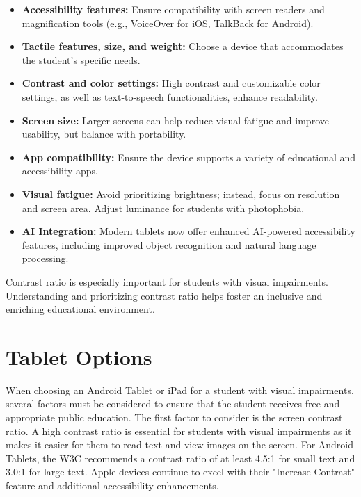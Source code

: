 \begin{itemize}

    \item \textbf{Accessibility features:} Ensure compatibility with screen readers and magnification tools (e.g., VoiceOver for iOS, TalkBack for Android).
     \cite{AndroidAccessibility}

    \item \textbf{Tactile features, size, and weight:} Choose a device that accommodates the student's specific needs.

    \item \textbf{Contrast and color settings:} High contrast and customizable color settings, as well as text-to-speech functionalities, enhance readability.

    \item \textbf{Screen size:} Larger screens can help reduce visual fatigue and improve usability, but balance with portability.

    \item \textbf{App compatibility:} Ensure the device supports a variety of educational and accessibility apps.

    \item \textbf{Visual fatigue:} Avoid prioritizing brightness; instead, focus on resolution and screen area. Adjust luminance for students with photophobia.

    \item \textbf{AI Integration:} Modern tablets now offer enhanced AI-powered accessibility features, including improved object recognition and natural language processing.

\end{itemize}

Contrast ratio is especially important for students with visual impairments. Understanding and prioritizing contrast ratio helps foster an inclusive and enriching educational environment.

\section{Tablet Options}\label{tab:tablet-options}
When choosing an Android Tablet or iPad for a student with visual impairments, several factors must be considered to ensure that the student receives free and appropriate public education. The first factor to consider is the screen contrast ratio. A high contrast ratio is essential for students with visual impairments as it makes it easier for them to read text and view images on the screen. For Android Tablets, the W3C recommends a contrast ratio of at least 4.5:1 for small text and 3.0:1 for large text.
 \cite{GoogleColorContrast}
Apple devices continue to excel with their "Increase Contrast" feature and additional accessibility enhancements.
 \cite{iMoreContrast}

